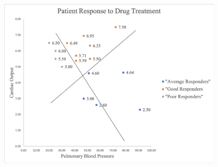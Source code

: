\documentclass[12pt,addpoints,answers]{exam}
\begin{document}
        \begin{figure}[H]
        \centering
        \includegraphics[width=1\textwidth]{patients.png}
        \end{figure}
\end{document}
